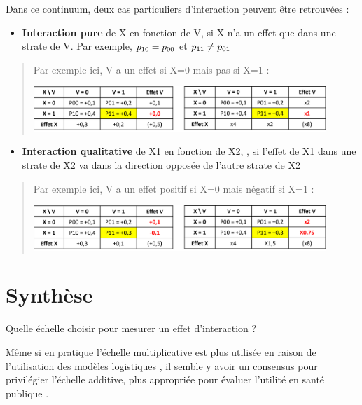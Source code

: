 \documentclass[
]{book}
\providecommand{\tightlist}{%
  \setlength{\itemsep}{0pt}\setlength{\parskip}{0pt}}
\begin{document}
Dans ce continuum, deux cas particuliers d'interaction peuvent être retrouvées :

\begin{itemize}
\tightlist
\item
  \textbf{Interaction pure} de X en fonction de V, si X n'a un effet que dans une strate de V. Par exemple, \(\small p_{10} = p_{00}\) et \(\small p_{11} \neq p_{01}\)
\end{itemize}

\begin{quote}
Par exemple ici, V a un effet si X=0 mais pas si X=1 :

\includegraphics[width=0.9\textwidth,height=\textheight]{img/Image8.png}
\end{quote}

\begin{itemize}
\tightlist
\item
  \textbf{Interaction qualitative} de X1 en fonction de X2, , si l'effet de X1 dans une strate de X2 va dans la direction opposée de l'autre strate de X2
\end{itemize}

\begin{quote}
Par exemple ici, V a un effet positif si X=0 mais négatif si X=1 :

\includegraphics[width=0.9\textwidth,height=\textheight]{img/Image9.png}
\end{quote}

\hypertarget{synthuxe8se-1}{%
\section{Synthèse}\label{synthuxe8se-1}}

Quelle échelle choisir pour mesurer un effet d'interaction ?

Même si en pratique l'échelle multiplicative est plus utilisée en raison de l'utilisation des modèles logistiques \citet{knol_recommendations_2012}, il semble y avoir un consensus pour privilégier l'échelle additive, plus appropriée pour évaluer l'utilité en santé publique \citet{vanderweele_tutorial_2014} \citet{knol_recommendations_2012}.
\end{document}
